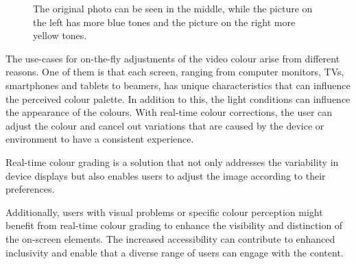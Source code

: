 \documentclass[../MasterThesis.tex]{subfiles}
\begin{document}
	
	\begin{figure}[H]
		\begin{center}
			\caption[Photo in different colour tones]{The original photo can be seen in the middle, while the picture on the left has more blue tones and the picture on the right more yellow tones.}
			\label{figure:coloursblueandyellow}
		\end{center}
	\end{figure}
	The use-cases for on-the-fly adjustments of the video colour arise from different reasons. 
	One of them is that each screen, ranging from computer monitors, TVs, smartphones and tablets to beamers, has unique characteristics that can influence the perceived colour palette. 
	In addition to this, the light conditions can influence the appearance of the colours.
	With real-time colour corrections, the user can adjust the colour and cancel out variations that are caused by the device or environment to have a consistent experience.
	
	Real-time colour grading is a solution that not only addresses the variability in device displays but also enables users to adjust the image according to their preferences.
	
	Additionally, users with visual problems or specific colour perception might benefit from real-time colour grading to enhance the visibility and distinction of the on-screen elements. 
	The increased accessibility can contribute to enhanced inclusivity and enable that a diverse range of users can engage with the content.
	
	
	
	
	
	
	
\end{document}
